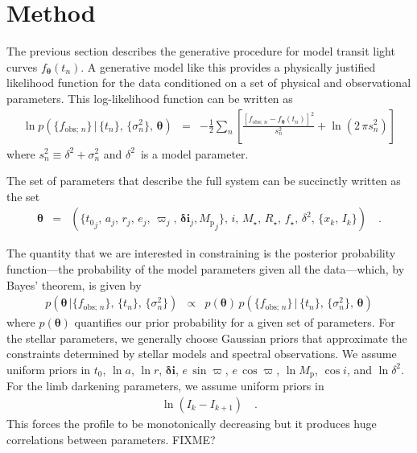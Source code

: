 \documentclass[12pt,preprint]{aastex}
\newcommand{\bvec}[1]{\ensuremath{\boldsymbol{#1}}}
\newcommand{\pr}[1]{\ensuremath{p (#1)}}
\newcommand{\setof}[1]{\ensuremath{\{ #1 \}}}
\newcommand{\model}{\ensuremath{\bvec{\theta}}}
\newcommand{\tobs}{\ensuremath{t_n}}
\newcommand{\fmodel}{\ensuremath{f_{\model} (\tobs)}}
\newcommand{\fobs}{\ensuremath{f_{\mathrm{obs};\,n}}}
\newcommand{\ferr}{\ensuremath{\sigma_n^2}}
\newcommand{\fullerr}{\ensuremath{s_n^2}}
\newcommand{\rstar}{\ensuremath{R_\star}}
\newcommand{\rplanet}{\ensuremath{r}}
\newcommand{\rsurface}{\ensuremath{x}}
\newcommand{\tzero}{\ensuremath{{t_0}}}
\newcommand{\smaxis}{\ensuremath{a}}
\newcommand{\ecc}{\ensuremath{e}}
\newcommand{\pomega}{\ensuremath{\varpi}}
\newcommand{\incl}{\ensuremath{\bvec{\delta i}}}
\newcommand{\mplanet}{\ensuremath{{M_\mathrm{p}}}}
\newcommand{\jitter}{\ensuremath{\delta^2}}
\newcommand{\mstar}{\ensuremath{M_\star}}
\newcommand{\fstar}{\ensuremath{f_\star}}
\newcommand{\iobs}{\ensuremath{i}}
\begin{document}
\section{Method}

The previous section describes the generative procedure for model transit
light curves \fmodel.
A generative model like this provides a physically justified likelihood
function for the data conditioned on a set of physical and observational
parameters.
This log-likelihood function can be written as
\begin{eqnarray}
    \ln \pr{\setof{\fobs}\,|\,\setof{\tobs},\,\setof{\ferr},\,\model}
    & = & -\frac{1}{2} \sum_{n} \left [ \frac{[\fobs - \fmodel]^2}{\fullerr}
+ \ln \left ( 2\,\pi\fullerr \right ) \right ]
\end{eqnarray}
where $\fullerr \equiv \jitter + \ferr$ and \jitter\ is a model parameter.

The set of parameters that describe the full system can be succinctly written
as the set
\begin{eqnarray}
    \model & = & \left (
        \setof{\tzero_j,\,\smaxis_j,\,\rplanet_j,\,\ecc_j,\,\pomega_j,\,
        \incl_j, \mplanet_j},\,\iobs,\,\mstar,\,\rstar,\,\fstar,\,\jitter,\,
        \setof{\rsurface_k,\,I_k}
    \right ) \quad.
\end{eqnarray}

The quantity that we are interested in constraining is the posterior
probability function---the probability of the model parameters given all the
data---which, by Bayes' theorem, is given by
\begin{eqnarray}
    \pr{\model\,|\setof{\fobs},\,\setof{\tobs},\,\setof{\ferr}}
    & \propto & \pr{\model} \, \pr{\setof{\fobs}\,|\,\setof{\tobs},
                                   \,\setof{\ferr},\,\model}
\end{eqnarray}
where $\pr{\model}$ quantifies our prior probability for a given set of
parameters.
For the stellar parameters, we generally choose Gaussian priors
that approximate the constraints determined by stellar models and spectral
observations.
We assume uniform priors in \tzero, $\ln\smaxis$, $\ln\rplanet$,
\incl, $\ecc\,\sin\pomega$, $\ecc\,\cos\pomega$, $\ln\mplanet$, $\cos \iobs$,
and $\ln\jitter$.
For the limb darkening parameters, we assume uniform priors in
\begin{eqnarray}
    \ln\left ( I_k - I_{k+1} \right ) \quad.
\end{eqnarray}
This forces the profile to be monotonically decreasing but it produces huge
correlations between parameters. FIXME?
\end{document}
